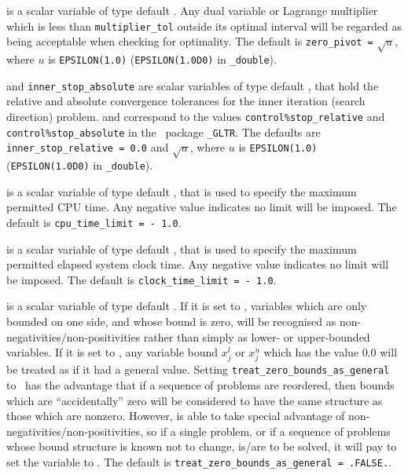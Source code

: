 \begin{description}
 is a scalar variable of type default \realdp.
Any dual variable or Lagrange multiplier which is less than
{\tt multiplier\_tol} outside its optimal interval will be regarded
as being acceptable when checking for optimality.
The default is {\tt zero\_pivot =} $\sqrt{u}$,
where $u$ is {\tt EPSILON(1.0)} ({\tt EPSILON(1.0D0)} in
{\tt \fullpackagename\_dou\-ble}).

 and {\tt inner\_stop\_absolute}
are scalar variables of type default \realdp,
that hold the relative and absolute convergence tolerances for the
inner iteration (search direction) problem.
and correspond to the values {\tt control\%stop\_relative} and
{\tt control\%stop\_absolute} in the \galahad\ package
{\tt \libraryname\_GLTR}.
The defaults are {\tt inner\_stop\_relative = 0.0}
and  $\sqrt{u}$,
where $u$ is {\tt EPSILON(1.0)} ({\tt EPSILON(1.0D0)} in
{\tt \fullpackagename\_double}).

 is a scalar variable of type default \realdp,
that is used to specify the maximum permitted CPU time. Any negative
value indicates no limit will be imposed. The default is
{\tt cpu\_time\_limit = - 1.0}.

 is a scalar variable of type default \realdp,
that is used to specify the maximum permitted elapsed system clock time.
Any negative value indicates no limit will be imposed. The default is
{\tt clock\_time\_limit = - 1.0}.

 is a scalar variable of type
default \logical.
If it is set to \false, variables which
are only bounded on one side, and whose bound is zero,
will be recognised as non-negativities/non-positivities rather than simply as
lower- or upper-bounded variables.
If it is set to \true, any variable bound
$x_{j}^{l}$ or $x_{j}^{u}$ which has the value 0.0 will be
treated as if it had a general value.
Setting {\tt treat\_zero\_bounds\_as\_general} to \true\ has the advantage
that if a sequence of problems are reordered, then bounds which are
``accidentally'' zero will be considered to have the same structure as
those which are nonzero. However, {\tt \fullpackagename} is
able to take special advantage of non-negativities/non-positivities, so
if a single problem, or if a sequence of problems whose
bound structure is known not to change, is/are to be solved,
it will pay to set the variable to \false.
The default is {\tt treat\_zero\_bounds\_as\_general = .FALSE.}.


\end{description}
